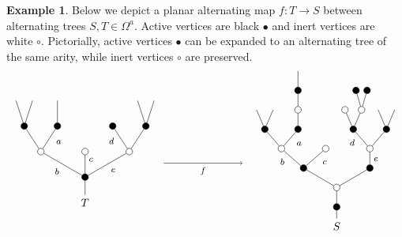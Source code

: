 \documentclass[a4paper,10pt
]{article}%
\numberwithin{equation}{section}
\numberwithin{figure}{section}
\theoremstyle{definition} %
\newtheorem{example}[equation]{Example}%
\newcommand{\1}{\ensuremath{\mathbbm 1}}%
\begin{document}
\begin{example}\label{ALTMAP EX}
	Below we depict a planar alternating map $f \colon T \to S$
	between alternating trees $S,T \in \Omega^a$.
	Active vertices are black $\bullet$ and inert vertices are white $\circ$.
	Pictorially, active vertices $\bullet$
	can be expanded to an alternating tree of the same arity,
	while inert vertices $\circ$ are preserved.
	\[
	\begin{tikzpicture}[grow=up,auto,level distance=2.3em,every node/.style = {font=\footnotesize},dummy/.style={circle,draw,inner sep=0pt,minimum size=2.1mm}]
	\tikzstyle{level 2}=[sibling distance = 4em]
	\tikzstyle{level 3}=[sibling distance = 3em]
	\tikzstyle{level 4}=[sibling distance = 1.5em]
	\node at (0,0.75) [font = \normalsize] {$T$}
	child{node [dummy,fill = black] {}
		child{node [dummy,fill=white] {}
			child{node [dummy,fill = black] {}
				child
				child
			}
			child{node [dummy,fill = black] {}
				edge from parent node [near end] {$d$}}
			edge from parent node [swap] {$e$}}
		child{node [dummy,fill=white] {}
			edge from parent node [swap, near end] {$c$}}
		child{node [dummy,fill=white] {}
			child{node [dummy,fill = black] {}
				child
				edge from parent node [swap, near end] {$a\phantom{d}$}}
			child{node [dummy,fill = black] {}
				child
				child
			}
			edge from parent node {$b$}}
	};
	\begin{scope}[level distance=1.75em]
	\tikzstyle{level 3}=[sibling distance = 6em]
	\tikzstyle{level 4}=[sibling distance = 4em]
	\tikzstyle{level 5}=[sibling distance = 3em]
	\tikzstyle{level 6}=[sibling distance = 1.5em]
	\tikzstyle{level 7}=[sibling distance = 1em]
	\node at (8,0) [font = \normalsize] {$S$}
	child{node [dummy,fill = black] {}
		child{node [dummy,fill = white] {}
			child{node [dummy,fill = black] {}
				child{node [dummy,fill=white] {}
					child{node [dummy,fill = black] {}
						child
						child
					}
					child{node [dummy,fill = black] {}
						child{node [dummy,fill=white] {}
							child{node [dummy,fill = black] {}}
							child{node [dummy,fill = black] {}}
						}
						child{node [dummy,fill=white] {}}
						edge from parent node [near end] {$d$}}
					edge from parent node [swap] {$e\phantom{1}$}}
			}
			child{node [dummy,fill = black] {}
				child{node [dummy,fill=white] {}
					edge from parent node [swap, near end] {$c\phantom{1}$}}
				child{node [dummy,fill=white] {}
					child{node [dummy,fill = black] {}
						child{node [dummy,fill=white] {}
							child{node [dummy,fill = black] {}
								child
							}
						}
						edge from parent node [swap,near end] {$a\phantom{d}$}}
					child{node [dummy,fill = black] {}
						child
						child
					}
					edge from parent node [near end] {$\phantom{1}b$}}
			}
		}
	};
	\end{scope}
	\draw [->] (2.5,2) -- node [swap] {$f$} (5,2);
	\end{tikzpicture}
	\]
\end{example}
\end{document}
